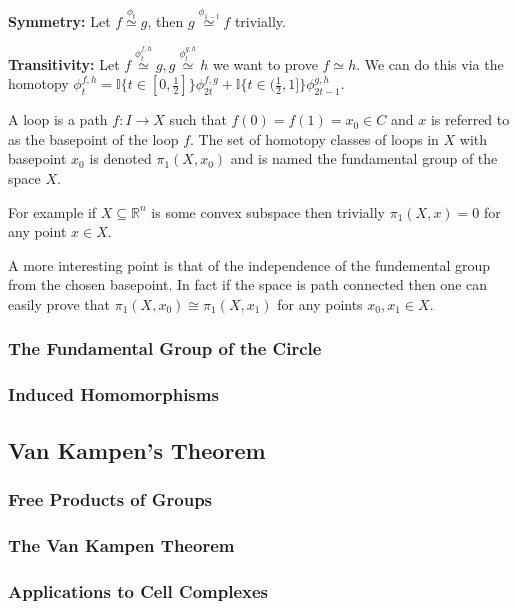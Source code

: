 \documentclass[11pt, a4paper]{article}
\begin{document}
\textbf{Symmetry: } Let $f\stackrel{\phi_t}{\simeq} g$, then $g\stackrel{\phi_{1-t}}{\simeq} f$ trivially.

\textbf{Transitivity: }Let $f\stackrel{\phi^{f,h}_t}{\simeq} g, g\stackrel{\phi^{g,h}_t}{\simeq} h$ we want to prove $f\simeq h$. We can do this via the homotopy $\phi^{f,h}_t = \mathbb{I}\{t\in [0,\frac12]\}\phi^{f,g}_{2t} + \mathbb{I}\{t\in (\frac12, 1]\}\phi^{g,h}_{2t-1}$.

A loop is a path $f: I\to X$ such that $f(0) = f(1) = x_0\in C$ and $x$ is referred to as the basepoint of the loop $f$. The set of homotopy classes of loops in $X$ with basepoint $x_0$ is denoted $\pi_1(X, x_0)$ and is named the fundamental group of the space $X$. 

For example if $X\subseteq \mathbb{R}^n$ is some convex subspace then trivially $\pi_1(X, x) = 0$ for any point $x\in X$. 

A more interesting point is that of the independence of the fundemental group from the chosen basepoint. In fact if the space is path connected then one can easily prove that $\pi_1(X, x_0) \cong \pi_1(X,x_1)$ for any points $x_0, x_1 \in X$.

\subsubsection{The Fundamental Group of the Circle}

\subsubsection{Induced Homomorphisms}

\subsection{Van Kampen's Theorem}

\subsubsection{Free Products of Groups}

\subsubsection{The Van Kampen Theorem}

\subsubsection{Applications to Cell Complexes}
\end{document}
